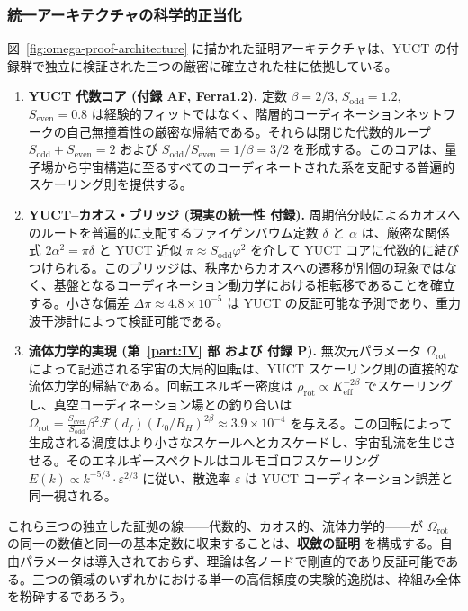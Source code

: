 \documentclass[11pt,a4paper]{article}
\begin{document}
	\subsubsection*{統一アーキテクチャの科学的正当化}
	
	図~\ref{fig:omega-proof-architecture} に描かれた証明アーキテクチャは、YUCT の付録群で独立に検証された三つの厳密に確立された柱に依拠している。
	
	\begin{enumerate}
		\item \textbf{YUCT 代数コア (付録 AF, Ferra1.2).} 定数 \(\beta = 2/3\), \(S_{\mathrm{odd}}=1.2\), \(S_{\mathrm{even}}=0.8\) は経験的フィットではなく、階層的コーディネーションネットワークの自己無撞着性の厳密な帰結である。それらは閉じた代数的ループ \(S_{\mathrm{odd}}+S_{\mathrm{even}}=2\) および \(S_{\mathrm{odd}}/S_{\mathrm{even}} = 1/\beta = 3/2\) を形成する。このコアは、量子場から宇宙構造に至るすべてのコーディネートされた系を支配する普遍的スケーリング則を提供する。
		
		\item \textbf{YUCT–カオス・ブリッジ (現実の統一性 付録).} 周期倍分岐によるカオスへのルートを普遍的に支配するファイゲンバウム定数 \(\delta\) と \(\alpha\) は、厳密な関係式 \(2\alpha^2 = \pi\delta\) と YUCT 近似 \(\pi \approx S_{\mathrm{odd}}\varphi^2\) を介して YUCT コアに代数的に結びつけられる。このブリッジは、秩序からカオスへの遷移が別個の現象ではなく、基盤となるコーディネーション動力学における相転移であることを確立する。小さな偏差 \(\Delta\pi \approx 4.8\times10^{-5}\) は YUCT の反証可能な予測であり、重力波干渉計によって検証可能である。
		
		\item \textbf{流体力学的実現 (第~\ref{part:IV} 部 および 付録 P).} 無次元パラメータ \(\Omega_{\mathrm{rot}}\) によって記述される宇宙の大局的回転は、YUCT スケーリング則の直接的な流体力学的帰結である。回転エネルギー密度は \(\rho_{\mathrm{rot}} \propto K_{\mathrm{eff}}^{-2\beta}\) でスケーリングし、真空コーディネーション場との釣り合いは \(\Omega_{\mathrm{rot}} = \frac{S_{\mathrm{even}}}{S_{\mathrm{odd}}} \beta^2 \mathcal{F}(d_f) (L_0/R_H)^{2\beta} \approx 3.9\times10^{-4}\) を与える。この回転によって生成される渦度はより小さなスケールへとカスケードし、宇宙乱流を生じさせる。そのエネルギースペクトルはコルモゴロフスケーリング \(E(k) \propto k^{-5/3} \cdot \varepsilon^{2/3}\) に従い、散逸率 \(\varepsilon\) は YUCT コーディネーション誤差と同一視される。
	\end{enumerate}
	
	これら三つの独立した証拠の線——代数的、カオス的、流体力学的——が \(\Omega_{\mathrm{rot}}\) の同一の数値と同一の基本定数に収束することは、\textbf{収斂の証明} を構成する。自由パラメータは導入されておらず、理論は各ノードで剛直的であり反証可能である。三つの領域のいずれかにおける単一の高信頼度の実験的逸脱は、枠組み全体を粉砕するであろう。
	
\end{document}
